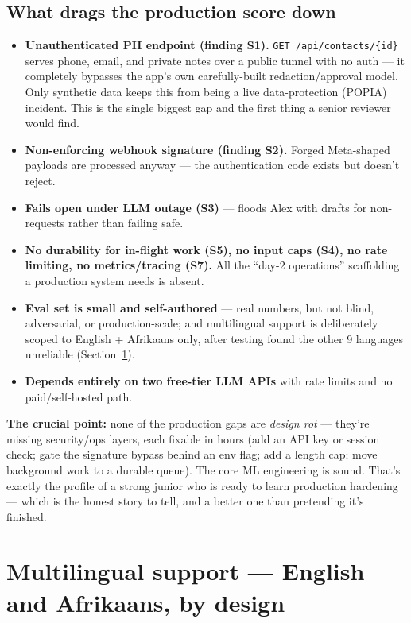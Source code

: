 \documentclass[11pt, a4paper]{article}
\newcommand{\badc}[1]{\textcolor{bad}{\textbf{#1}}}
\begin{document}
\subsection{What drags the production score down}
\begin{itemize}
    \item \badc{Unauthenticated PII endpoint (finding S1).} \texttt{GET /api/contacts/\{id\}} serves phone, email, and private notes over a public tunnel with no auth --- it completely bypasses the app's own carefully-built redaction/approval model. Only synthetic data keeps this from being a live data-protection (POPIA) incident. This is the single biggest gap and the first thing a senior reviewer would find.
    \item \badc{Non-enforcing webhook signature (finding S2).} Forged Meta-shaped payloads are processed anyway --- the authentication code exists but doesn't reject.
    \item \textbf{Fails open under LLM outage (S3)} --- floods Alex with drafts for non-requests rather than failing safe.
    \item \textbf{No durability for in-flight work (S5), no input caps (S4), no rate limiting, no metrics/tracing (S7).} All the ``day-2 operations'' scaffolding a production system needs is absent.
    \item \textbf{Eval set is small and self-authored} --- real numbers, but not blind, adversarial, or production-scale; and multilingual support is deliberately scoped to English + Afrikaans only, after testing found the other 9 languages unreliable (Section~\ref{sec:multilingual}).
    \item \textbf{Depends entirely on two free-tier LLM APIs} with rate limits and no paid/self-hosted path.
\end{itemize}

\textbf{The crucial point:} none of the production gaps are \emph{design rot} --- they're missing security/ops layers, each fixable in hours (add an API key or session check; gate the signature bypass behind an env flag; add a length cap; move background work to a durable queue). The core ML engineering is sound. That's exactly the profile of a strong junior who is ready to learn production hardening --- which is the honest story to tell, and a better one than pretending it's finished.

\section{Multilingual support --- English and Afrikaans, by design}
\label{sec:multilingual}
\end{document}

